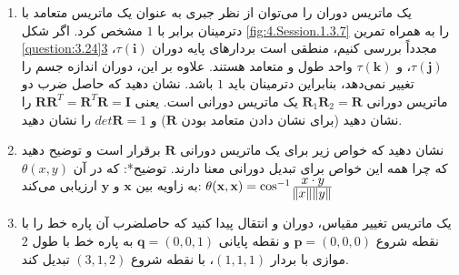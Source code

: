 {\begin{spacing}{1.5}
\begin{enumerate}[label=\textbf{\arabic*}.]
            \item {یک ماتریس دوران را می‌توان از نظر جبری به عنوان یک ماتریس متعامد با دترمینان برابر با $1$ مشخص کرد. اگر شکل \ref{fig:4.Session.1.3.7} را به همراه تمرین \hyperref[question:3.24]{\ref{question:3.24}3} مجدداً بررسی کنیم، منطقی است بردارهای پایه دوران $\tau(\textbf{i})$، $\tau(\textbf{j})$، و $\tau(\textbf{k})$ واحد طول و متعامد هستند.
            علاوه بر این، دوران اندازه جسم را تغییر نمی‌دهد، بنابراین دترمینان باید $1$ باشد.
            نشان دهید که حاصل ضرب دو ماتریس دورانی $\textbf{R}_{1}\textbf{R}_{2}=\textbf{R}$ یک ماتریس دورانی است.
            یعنی $\textbf{RR}^{T}=\textbf{R}^{T}\textbf{R}=\textbf{I}$ را نشان دهید (برای نشان دادن متعامد بودن $\textbf{R}$) و $det\textbf{R}=1$ را نشان دهید.} \\\textbf{\vspace{6pt}}

            \item {
                نشان دهید که خواص زیر برای یک ماتریس دورانی $\textbf{R}$ برقرار است و توضیح دهید که چرا همه این خواص برای تبدیل دورانی معنا دارند.
                 \textbf{\vspace{-6pt}}
                توضیح*: که در آن $\theta(x,y)$ به زاویه بین $\textbf{x}$ و $\textbf{y}$ ارزیابی می‌کند: $\theta(\textbf{x},\textbf{x})=\cos^{-1}\frac{\displaystyle x\cdot y}{\displaystyle \norm{x}\norm{y}}$
            } \\\textbf{\vspace{6pt}}

            \item {یک ماتریس تغییر مقیاس، دوران و انتقال پیدا کنید که حاصلضرب آن پاره خط را با نقطه شروع $\textbf{p}=(0,0,0)$ و نقطه پایانی $\textbf{q}=(0,0,1)$ به پاره خط با طول $2$ موازی با بردار $(1,1,1)$، با نقطه شروع $(3,1,2)$ تبدیل کند.} \\\textbf{\vspace{6pt}}


\end{enumerate}
\end{spacing}}
